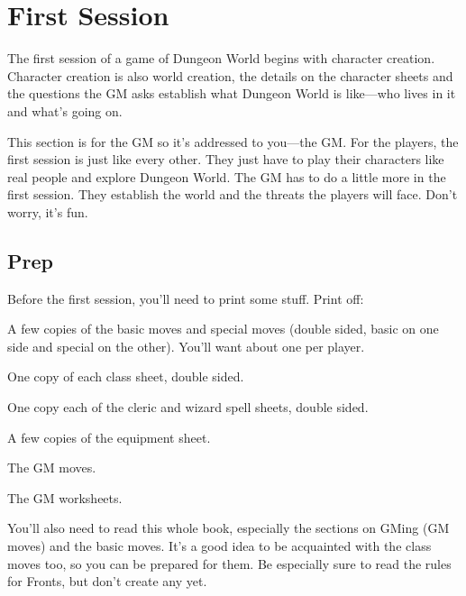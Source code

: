 \chapter{First Session}
  
 



The first session of a game of Dungeon World begins with character creation. Character creation is also world creation, the details on the character sheets and the questions the GM asks establish what Dungeon World is like—who lives in it and what's going on.

 

This section is for the GM so it's addressed to you—the GM. For the players, the first session is just like every other. They just have to play their characters like real people and explore Dungeon World. The GM has to do a little more in the first session. They establish the world and the threats the players will face. Don't worry, it's fun.

 
\section{Prep}   
 

Before the first session, you'll need to print some stuff. Print off:

 
\startitemize[1,packed]

\item A few copies of the basic moves and special moves (double sided, basic on one side and special on the other). You'll want about one per player.

 
\item One copy of each class sheet, double sided.

 
\item One copy each of the cleric and wizard spell sheets, double sided.

 
\item A few copies of the equipment sheet.

 
\item The GM moves.

 
\item The GM worksheets.


\stopitemize
 

You'll also need to read this whole book, especially the sections on GMing (GM moves) and the basic moves. It's a good idea to be acquainted with the class moves too, so you can be prepared for them. Be especially sure to read the rules for Fronts, but don't create any yet.

